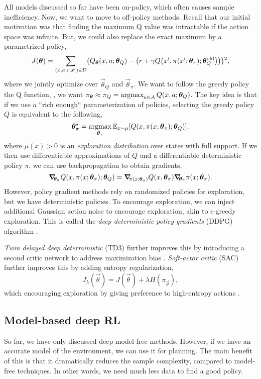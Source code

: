 All models discussed so far have been on-policy, which often causes sample
inefficiency. Now, we want to move to off-policy methods. Recall that our
initial motivation was that finding the maximum Q value was intractable if the
action space was infinite. But, we could also replace the exact maximum by a
parametrized policy, \[
  J(\vec{\theta}) = \sum_{(x,a,r,x')\in \mathcal{D}} \lft( Q_{\vec{\theta}}(x,a; \vec{\theta}_Q) - \lft( r + \gamma Q \lft( x', \pi(x'; \vec{\theta}_\pi); \vec{\theta}_Q^{\text{old}} \rgt) \rgt) \rgt)^2
,\]
where we jointly optimize over $\vec{\theta}_Q$ and $\vec{\theta}_\pi$. We want
to follow the greedy policy \wrt the Q function, \ie, we want
$\pi_{\vec{\theta}} \approx \pi_Q = \argmax_{a\in\mathcal{A}}
Q(x,a;\vec{\theta}_Q)$. The key idea is that if we use a ``rich enough``
parameterization of policies, selecting the greedy policy \wrt $Q$ is
equivalent to the following, \[
  \vec{\theta}_\pi^\star = \argmax_{\vec{\theta}_\pi} \E_{x\sim \mu} [Q(x, \pi(x; \vec{\theta}_\pi); \vec{\theta}_Q)]
,\]
where $\mu(x) > 0$ is an \textit{exploration distribution} over states with
full support. If we then use differentiable approximations of $Q$ and a
differentiable deterministic policy $\pi$, we can use backpropagation to obtain
gradients, \[
  \grad{Q(x, \pi(x; \vec{\theta}_\pi); \vec{\theta}_Q)}{\vec{\theta}_\pi} = \grad{Q(x,\vec{\theta}_\pi)}{\pi(x; \vec{\theta}_\pi)} \grad{\pi(x; \vec{\theta}_\pi)}{\vec{\theta}_\pi}
.\]
However, policy gradient methods rely on randomized policies for exploration,
but we have deterministic policies. To encourage exploration, we can inject
additional Gaussian action noise to encourage exploration, akin to
$\epsilon$-greedy exploration. This is called the \textit{deep deterministic
policy gradients} (DDPG) algorithm \citep{lillicrap2015continuous}.

\textit{Twin delayed deep deterministic} (TD3) further improves this by
introducing a second critic network to address maximization bias
\citep{fujimoto2018addressing}. \textit{Soft-actor critic} (SAC) further
improves this by adding entropy regularization, \[
  J_{\lambda}(\vec{\theta}) = J(\vec{\theta}) + \lambda H(\pi_{\vec{\theta}})
,\]
which encouraging exploration by giving preference to high-entropy actions
\citep{haarnoja2018soft}.

\subsection{Model-based deep RL}

So far, we have only discussed deep model-free methods. However, if we have an
accurate model of the environment, we can use it for planning. The main benefit
of this is that it dramatically reduces the sample complexity, compared to
model-free techniques. In other words, we need much less data to find a good
policy.

